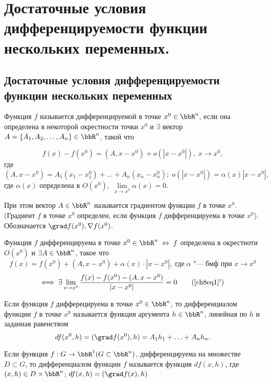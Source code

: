 \chapter[\texorpdfstring{Достаточные условия дифференцируемости функции не\-скольких переменных.}{Достаточные условия дифференцируемости функции нескольких переменных}]{Достаточные условия дифференцируемости функции нескольких переменных.}
\section[\texorpdfstring{Достаточные условия дифференцируемости функции \\несколь\-ких переменных.}{Достаточные условия дифференцируемости функции нескольких переменных}]{Достаточные условия дифференцируемости функции нескольких переменных}

\begin{defn}
Функция $f$ называется дифференцируемой в точке $x^0 \in \bbR^n$, если она определена в некоторой окрестности точки $x^0$ и $\exists$ вектор $A = \{ A_1, A_2, \ldots , A_n\} \in \bbR^n$, такой что 

\begin{equation} \label{ch8eq1}
f(x) - f(x^0) = (A, x - x^0) + o(|x - x^0|), \; x \to x^0, 
\end{equation}
где $(A, x - x^0) = A_1(x_1 - x^0_1) + \ldots + A_n(x_n - x^0_n); \; o(|x - x^0|) = \alpha(x)|x - x^0|,$ где $\alpha(x)$ определена в $O(x^0), \; \lim\limits_{x \to x^0} \alpha(x) = 0$.

При этом вектор $A \in \bbR^n$ называется градиентом функции $f$ в точке $x^0$. (Градиент $f$ в точке $x^0$ определен, если функция $f$ дифференцируема в точке $x^0$). Обозначается $\grad f(x^0), \nabla f(x^0)$.

Функция $f$ дифференцируема в точке $x^0 \in \bbR^n \; \Leftrightarrow \; f$ определена в окрестноти $O(x^0)$ и $\exists A \in \bbR^n$, такое что 
$$
f(x) = f(x^0) + (A, x - x^0) + \alpha(x) \cdot |x - x^0|, \; \textit{где} \; \alpha \text{ "--- бмф при } x \to x^0 
$$ 
\begin{equation} \label{ch8eq1'}
\Longleftrightarrow \; \exists \lim\limits_{x \to x^0} \frac{f(x) - f(x^0) - (A, x - x^0)}{|x - x^0|} = 0
\tag{\ref{ch8eq1}$'$}
\end{equation}
\end{defn}

\begin{defn}
Если функция $f$ дифферецируема в точке $x^0 \in \bbR^n$, то дифференциалом функции $f$ в точке $x^0$ называется функция аргумента $h \in \bbR^n$, линейная  по $h$ и заданная равенством
$$
df(x^0, h) = (\grad f(x^0), h) = A_1 h_1 + \ldots + A_n h_n.
$$

Если функция $f: G \to \bbR^1 (G \subset \bbR^n)$, дифференцируема на множестве $D \subset G$, то дифференциалом функции $f$ называется функция $df(x,h)$, где $(x,h) \in D \times \bbR^n$; $df(x,h) = (\grad f(x), h)$
\end{defn}

